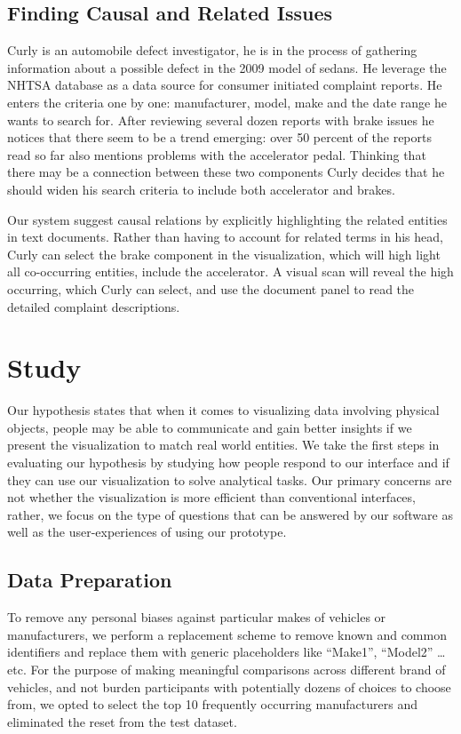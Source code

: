 \subsection{Finding Causal and Related Issues}
Curly is an automobile defect investigator, he is in the process of gathering
information about a possible defect in the 2009 model of sedans. He leverage the
NHTSA database as a data source for consumer initiated complaint reports. He
enters the criteria one by one: manufacturer, model, make and the date range he
wants to search for. After reviewing several dozen reports with brake issues he
notices that there seem to be a trend emerging: over 50 percent of the reports
read so far also mentions problems with the accelerator pedal. Thinking that
there may be a connection between these two components Curly decides that he
should widen his search criteria to include both accelerator and brakes.

Our system suggest causal relations by explicitly highlighting the related
entities in text documents. Rather than having to account for related terms in
his head, Curly can select the brake component in the visualization, which will
high light all co-occurring entities, include the accelerator. A visual scan
will reveal the high occurring, which Curly can select, and use the document
panel to read the detailed complaint descriptions.


\section{Study}
Our hypothesis states that when it comes to visualizing data involving physical
objects, people may be able to communicate and gain better insights if we
present the visualization to match real world entities. We take the first steps
in evaluating our hypothesis by studying how people respond to our \threed
interface and if they can use our visualization to solve analytical tasks. Our
primary concerns are not whether the visualization is more efficient than
conventional interfaces, rather, we focus on the type of questions that can be
answered by our software as well as the user-experiences of using our prototype.

\subsection{Data Preparation}
To remove any personal biases against particular makes of vehicles or
manufacturers, we perform a replacement scheme to remove known and common
identifiers and replace them with generic placeholders like ``Make1'',
``Model2'' \ldots etc. For the purpose of making meaningful comparisons across
different brand of vehicles, and not burden participants with potentially
dozens of choices to choose from, we opted to select the top 10 frequently
occurring manufacturers and eliminated the reset from the test dataset.

